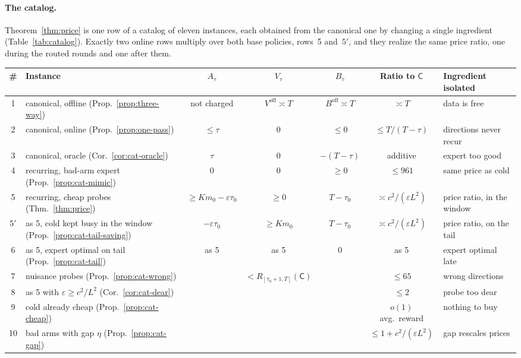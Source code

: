 \documentclass{article}
\theoremstyle{definition}
\theoremstyle{remark}
\newcommand{\eps}{\varepsilon}
\theoremstyle{remark}
\newcommand{\Cold}{\mathsf{C}}
\begin{document}
\paragraph{The catalog.}
Theorem~\ref{thm:price} is one row of a catalog of eleven instances, each
obtained from the canonical one by changing a single ingredient
(Table~\ref{tab:catalog}). Exactly two online rows multiply over both base policies,
rows~5 and~$5'$, and they realize the same price ratio, one during the routed
rounds and one after them.

\begin{table}[t]
\centering
\scriptsize
\setlength{\tabcolsep}{2.5pt}
\begin{tabular}{@{}clccccl@{}}
\toprule
\# & Instance & $A_\tau$ & $V_\tau$ & $B_\tau$ & Ratio to $\Cold$ & Ingredient isolated\\
\midrule
1 & canonical, offline (Prop.~\ref{prop:three-way}) & not charged & $V^{\mathrm{off}}\asymp T$ & $B^{\mathrm{off}}\asymp T$ & $\asymp T$ & data is free\\
2 & canonical, online (Prop.~\ref{prop:one-pass}) & $\le\tau$ & $0$ & $\le0$ & $\le T/(T-\tau)$ & directions never recur\\
3 & canonical, oracle (Cor.~\ref{cor:cat-oracle}) & $\tau$ & $0$ & $-(T-\tau)$ & additive & expert too good\\
4 & recurring, bad-arm expert (Prop.~\ref{prop:cat-mimic}) & $0$ & $0$ & $\ge0$ & $\le961$ & same price as cold\\
5 & recurring, cheap probes (Thm.~\ref{thm:price}) & $\ge Km_0-\eps\tau_0$ & $\ge0$ & $T-\tau_0$ & $\asymp c^2/(\eps L^2)$ & price ratio, in the window\\
$5'$ & as 5, cold kept busy in the window (Prop.~\ref{prop:cat-tail-saving}) & $-\eps\tau_0$ & $\ge Km_0$ & $T-\tau_0$ & $\asymp c^2/(\eps L^2)$ & price ratio, on the tail\\
6 & as 5, expert optimal on tail (Prop.~\ref{prop:cat-tail}) & as 5 & as 5 & $0$ & as 5 & expert optimal late\\
7 & nuisance probes (Prop.~\ref{prop:cat-wrong}) & & $<R_{[\tau_0+1,T]}(\Cold)$ & & $\le65$ & wrong directions\\
8 & as 5 with $\eps\ge c^2/L^2$ (Cor.~\ref{cor:cat-dear}) & & & & $\le2$ & probe too dear\\
9 & cold already cheap (Prop.~\ref{prop:cat-cheap}) & & & & $o(1)$ avg.\ reward & nothing to buy\\
10 & bad arms with gap $\eta$ (Prop.~\ref{prop:cat-gap}) & & & & $\le1+c^2/(\eps L^2)$ & gap rescales prices\\

\end{tabular}
\end{table}
\end{document}
